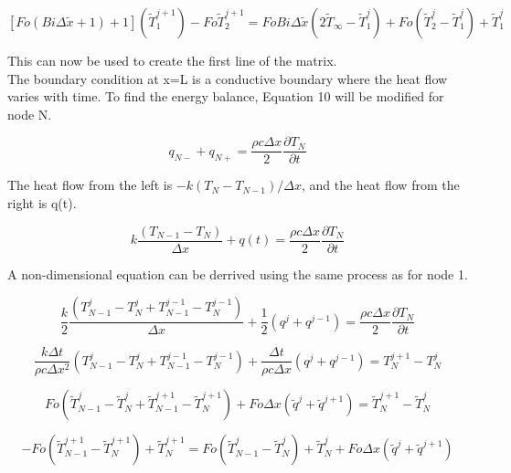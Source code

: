 \documentclass[conf]{new-aiaa}
\begin{document}
\begin{equation}
\label{sample:equation}
[Fo(Bi \Delta \tilde{x}+1)+1] (\tilde{T}^{j+1}_1)
-Fo \tilde{T}_2^{j+1}
=
Fo Bi \Delta \tilde{x} (2\tilde{T}_\infty-\tilde{T}^{j}_1)
+Fo (\tilde{T}_2^{j}-\tilde{T}_1^{j})+\tilde{T}_1^{j}
\end{equation}

This can now be used to create the first line of the matrix.
\\
The boundary condition at x=L is a conductive boundary where the heat flow varies with time. To find the energy balance, Equation 10 will be modified for node N.

\begin{equation}
\label{sample:equation}
   q_{N-}+q_{N+}=\frac{\rho c \Delta x}{2}\frac{\partial T_N}{\partial t}
\end{equation}

The heat flow from the left is $-k(T_N-T_{N-1})/\Delta x$, and the heat flow from the right is q(t).

\begin{equation}
\label{sample:equation}
   k\frac{(T_{N-1}-T_N)}{\Delta x}+q(t)=\frac{\rho c \Delta x}{2}\frac{\partial T_N}{\partial t}
\end{equation}

A non-dimensional equation can be derrived using the same process as for node 1.

\begin{equation}
\label{sample:equation}
   \frac{k}{2}\frac{(T^j_{N-1}-T^j_N+T^{j-1}_{N-1}-T^{j-1}_N)}{\Delta x}+\frac{1}{2}(q^j+q^{j-1})=\frac{\rho c \Delta x}{2}\frac{\partial T_N}{\partial t}
\end{equation}

\begin{equation}
\label{sample:equation}
   \frac{k \Delta t}{\rho c \Delta x^2}(T^j_{N-1}-T^j_N+T^{j-1}_{N-1}-T^{j-1}_N)+\frac{\Delta t}{\rho c \Delta x}(q^j+q^{j-1})=T^{j+1}_N-T^{j}_N
\end{equation}

\begin{equation}
\label{sample:equation}
   Fo (\tilde{T}^j_{N-1}-\tilde{T}^j_N+\tilde{T}^{j+1}_{N-1}-\tilde{T}^{j+1}_N)+Fo \Delta x (\tilde{q}^j+\tilde{q}^{j+1})=\tilde{T}^{j+1}_N-\tilde{T}^{j}_N
\end{equation}

\begin{equation}
\label{sample:equation}
   -Fo (\tilde{T}^{j+1}_{N-1}-\tilde{T}^{j+1}_N)+\tilde{T}^{j+1}_N=Fo (\tilde{T}^j_{N-1}-\tilde{T}^j_N)+\tilde{T}^{j}_N+Fo \Delta x (\tilde{q}^j+\tilde{q}^{j+1})
\end{equation}
\end{document}
